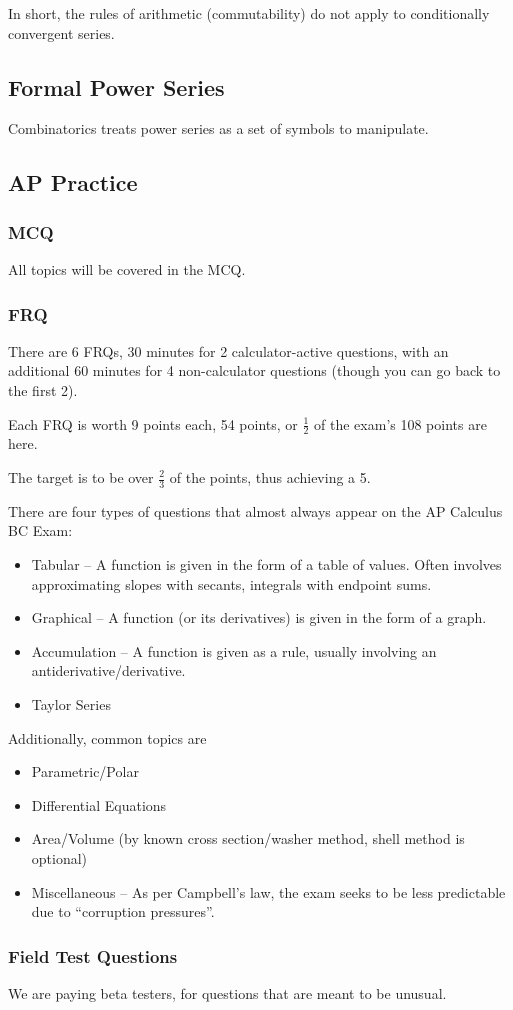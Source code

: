 \documentclass{article}
\begin{document}
In short, the rules of arithmetic (commutability) do not apply to conditionally convergent series.

\subsection{Formal Power Series}
Combinatorics treats power series as a set of symbols to manipulate.

\subsection{AP Practice}
\subsubsection{MCQ}
All topics will be covered in the MCQ.

\subsubsection{FRQ}
There are 6 FRQs, 30 minutes for 2 calculator-active questions, with an additional 60 minutes for 4 non-calculator questions (though you can go back to the first 2).

Each FRQ is worth 9 points each, 54 points, or $\frac{1}{2}$ of the exam's 108 points are here.

The target is to be over $\frac{2}{3}$ of the points, thus achieving a 5.

There are four types of questions that almost always appear on the AP Calculus BC Exam:
\begin{itemize}
    \item Tabular -- A function is given in the form of a table of values. Often involves approximating slopes with secants, integrals with endpoint sums.
    \item Graphical -- A function (or its derivatives) is given in the form of a graph.
    \item Accumulation -- A function is given as a rule, usually involving an antiderivative/derivative.
    \item Taylor Series
\end{itemize}

Additionally, common topics are
\begin{itemize}
    \item Parametric/Polar
    \item Differential Equations
    \item Area/Volume (by known cross section/washer method, shell method is optional)
    \item Miscellaneous -- As per Campbell's law, the exam seeks to be less predictable due to ``corruption pressures''.
\end{itemize}

\subsubsection{Field Test Questions}
We are paying beta testers, for questions that are meant to be unusual.
\end{document}
